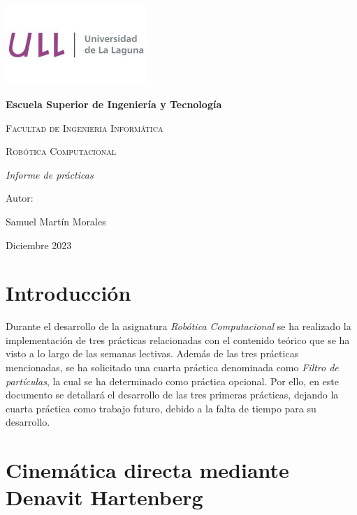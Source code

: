 \documentclass[11pt]{report}
\begin{document}

\begin{titlepage}
    \centering
    {\includegraphics[width=0.4\textwidth]{src/img/logo.jpg}\par}
    \vspace{1cm}
    {\bfseries\LARGE Escuela Superior de Ingeniería y Tecnología\par}
    \vspace{1cm}
    {\scshape\Large Facultad de Ingeniería Informática \par}
    \vspace{3cm}
    {\scshape\Huge Robótica Computacional \par}
    \vspace{3cm}
    {\itshape\Large Informe de prácticas \par}
    \vfill
    {\Large Autor: \par}
    {\Large Samuel Martín Morales \par}
    \vfill
    {\Large Diciembre 2023 \par}
    \end{titlepage} 

\tableofcontents

\chapter{Introducción}

Durante el desarrollo de la asignatura \emph{Robótica Computacional} se ha realizado la implementación de tres prácticas relacionadas con el contenido teórico que se ha visto a lo largo de las semanas lectivas. Además de las tres prácticas mencionadas, se ha solicitado una cuarta práctica denominada como \emph{Filtro de partículas}, la cual se ha determinado como práctica opcional. Por ello, en este documento se detallará el desarrollo de las tres primeras prácticas, dejando la cuarta práctica como trabajo futuro, debido a la falta de tiempo para su desarrollo.

\chapter{Cinemática directa mediante Denavit Hartenberg}
\end{document}
